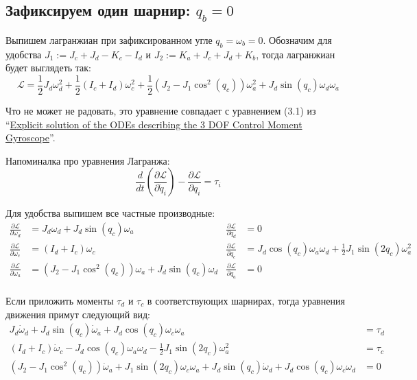\documentclass{article}
\begin{document}
\subsection{Зафиксируем один шарнир: $q_b=0$}

Выпишем лагранжиан при зафиксированном угле $q_b=\omega_b=0$.
Обозначим для удобства $J_1:=J_c+J_d-K_c-I_d$ и $J_2:=K_a+J_c+J_d+K_b$, тогда лагранжиан будет выглядеть так:
$$
\mathcal L=\frac{1}{2}J_d \omega_d^2 + \frac{1}{2}(I_c+I_d) \omega_c^2 + \frac{1}{2}\left(J_2 - J_1 \cos^2(q_c)\right) \omega_a^2 + J_d \sin(q_c) \omega_d \omega_a
$$


Что не может не радовать, это уравнение совпадает с уравнением (3.1) из ``\href{http://www.mate.tue.nl/mate/pdfs/9731.pdf}{Explicit solution of the ODEs describing the 3 DOF Control Moment Gyroscope}''.

Напоминалка про уравнения Лагранжа:
$$
\frac{d}{dt}\left(\frac{\partial\mathcal L}{\partial\dot q_i}\right) - \frac{\partial\mathcal L}{\partial q_i} = \tau_i
$$

Для удобства выпишем все частные производные:
\begin{align*}
\frac{\partial\mathcal L}{\partial\omega_d} &=  J_d \omega_d + J_d \sin(q_c) \omega_a & \frac{\partial\mathcal L}{\partial q_d} & =  0\\
\frac{\partial\mathcal L}{\partial\omega_c} &= (I_d+I_c)\omega_c                      & \frac{\partial\mathcal L}{\partial q_c} &= J_d \cos(q_c) \omega_a \omega_d + \frac{1}{2}J_1  \sin(2 q_c) \omega_a^2  \\
\frac{\partial\mathcal L}{\partial\omega_a} &= \left(J_2 - J_1 \cos^2(q_c)\right) \omega_a  + J_d \sin(q_c) \omega_d  & \frac{\partial\mathcal L}{\partial q_a}   &= 0\\
\end{align*}

Если приложить моменты $\tau_d$ и $\tau_c$ в соответствующих шарнирах, тогда уравнения движения примут следующий вид:
\begin{align*}
 J_d \dot\omega_d + J_d \sin(q_c)\dot \omega_a + J_d \cos(q_c)\omega_c\omega_a &=\tau_d\\
(I_d+I_c)\dot\omega_c - J_d \cos(q_c) \omega_a \omega_d - \frac{1}{2}J_1  \sin(2 q_c) \omega_a^2  &= \tau_c \\
\left(J_2 - J_1 \cos^2(q_c)\right)\dot \omega_a + J_1 \sin(2 q_c)\omega_c\omega_a +  J_d \sin(q_c) \dot\omega_d + J_d \cos(q_c) \omega_c\omega_d &= 0\\
\end{align*}
\end{document}
